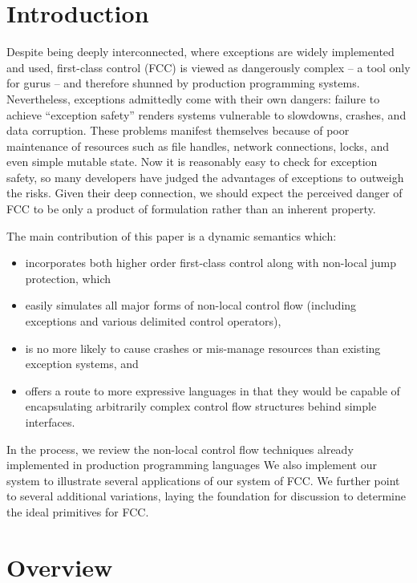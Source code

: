 \documentclass[11pt]{article}
\begin{document}
\section{Introduction}

Despite being deeply interconnected, where exceptions are widely implemented and used, first-class control (FCC) is viewed as dangerously complex -- a tool only for gurus -- and therefore shunned by production programming systems.
Nevertheless, exceptions admittedly come with their own dangers: failure to achieve ``exception safety'' renders systems vulnerable to slowdowns, crashes, and data corruption.
These problems manifest themselves because of poor maintenance of resources such as file handles, network connections, locks, and even simple mutable state.
Now it is reasonably easy to check for exception safety, so many developers have judged the advantages of exceptions to outweigh the risks.
Given their deep connection, we should expect the perceived danger of FCC to be only a product of formulation rather than an inherent property.

The main contribution of this paper is a dynamic semantics which:
\begin{itemize}
\item incorporates both higher order first-class control along with non-local jump protection, which
\item easily simulates all major forms of non-local control flow (including exceptions and various delimited control operators),
\item is no more likely to cause crashes or mis-manage resources than existing exception systems, and
\item offers a route to more expressive languages in that they would be capable of encapsulating arbitrarily complex control flow structures behind simple interfaces.
\end{itemize}
In the process, we review the non-local control flow techniques already implemented in production programming languages
We also implement our system to illustrate several applications of our system of FCC.
We further point to several additional variations, laying the foundation for discussion to determine the ideal primitives for FCC.

\section{Overview}
\end{document}

